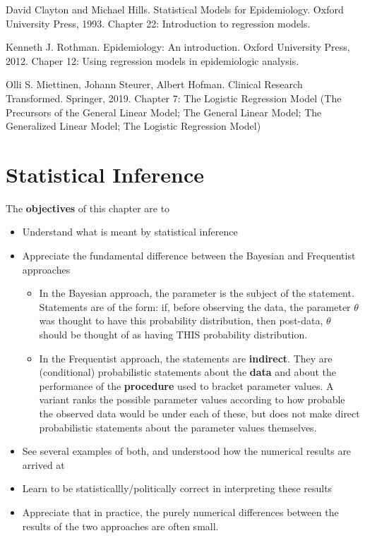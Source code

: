 \documentclass[]{book}
\begin{document}
David Clayton and Michael Hills. Statistical Models for Epidemiology. Oxford University Press, 1993. Chapter 22: Introduction to regression models.

Kenneth J. Rothman. Epidemiology: An introduction.
Oxford University Press, 2012. Chaper 12: Using regression models in epidemiologic analysis.

Olli S. Miettinen, Johann Steurer, Albert Hofman.
Clinical Research Transformed. Springer, 2019.
Chapter 7: The Logistic Regression Model (The Precursors of the General Linear Model; The General Linear Model; The Generalized Linear Model; The Logistic Regression Model)

\hypertarget{inference}{%
\chapter{Statistical Inference}\label{inference}}

The \textbf{objectives} of this chapter are to

\begin{itemize}
\item
  Understand what is meant by statistical inference
\item
  Appreciate the fundamental difference between the Bayesian and Frequentist approaches

  \begin{itemize}
  \item
    In the Bayesian approach, the parameter is the subject of the statement. Statements are of the form: if, before observing the data, the parameter \(\theta\) was thought to have this probability distribution, then post-data, \(\theta\) should be thought of as having THIS probability distribution.
  \item
    In the Frequentist approach, the statements are \textbf{indirect}. They are (conditional) probabilistic statements about the \textbf{data} and about the performance of the \textbf{procedure} used to bracket parameter values. A variant ranks the possible parameter values according to how probable the observed data would be under each of these, but does not make direct probabilistic statements about the parameter values themselves.
  \end{itemize}
\item
  See several examples of both, and understood how the numerical results are arrived at
\item
  Learn to be statisticallly/politically correct in interpreting these results
\item
  Appreciate that in practice, the purely numerical differences between the results of the two approaches are often small.
\end{itemize}
\end{document}
